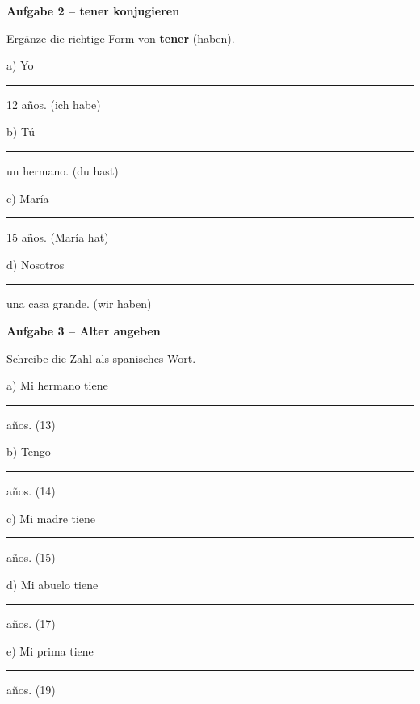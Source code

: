\documentclass[11pt, a4paper]{article}
\newcommand{\fachfarbe}{spanisch}
\newcommand{\punktebox}[1]{\hfill\fbox{\small \_/#1}}
\newcommand{\luecke}[1]{\rule{#1}{0.4pt}}
\newenvironment{aufgabe}[1]{%
    \needspace{5\baselineskip}%
    \nopagebreak[4]%
    \vspace{10pt}
    \noindent\textbf{\textcolor{\fachfarbe}{Aufgabe #1}}
    \nopagebreak[4]%
    \vspace{5pt}
    \nopagebreak[4]%
    \begin{list}{}{\leftmargin=0pt}
    \item[]
}{%
    \end{list}
}
\newcommand{\es}[1]{\textcolor{\fachfarbe}{\textbf{#1}}}
\begin{document}
\vspace{15pt}


\begin{aufgabe}{2 -- tener konjugieren}
Ergänze die richtige Form von \es{tener} (haben). \punktebox{8}
\end{aufgabe}

\noindent
a) Yo \luecke{2.5cm} 12 años. \hfill (ich habe)

\vspace{0.8em}

\noindent
b) Tú \luecke{2.5cm} un hermano. \hfill (du hast)

\vspace{0.8em}

\noindent
c) María \luecke{2.5cm} 15 años. \hfill (María hat)

\vspace{0.8em}

\noindent
d) Nosotros \luecke{2.5cm} una casa grande. \hfill (wir haben)

\vspace{15pt}


\begin{aufgabe}{3 -- Alter angeben}
Schreibe die Zahl als spanisches Wort. \punktebox{10}
\end{aufgabe}

\noindent
a) Mi hermano tiene \luecke{3.5cm} años. \hfill (13)

\vspace{0.8em}

\noindent
b) Tengo \luecke{3.5cm} años. \hfill (14)

\vspace{0.8em}

\noindent
c) Mi madre tiene \luecke{3.5cm} años. \hfill (15)

\vspace{0.8em}

\noindent
d) Mi abuelo tiene \luecke{3.5cm} años. \hfill (17)

\vspace{0.8em}

\noindent
e) Mi prima tiene \luecke{3.5cm} años. \hfill (19)
\end{document}
